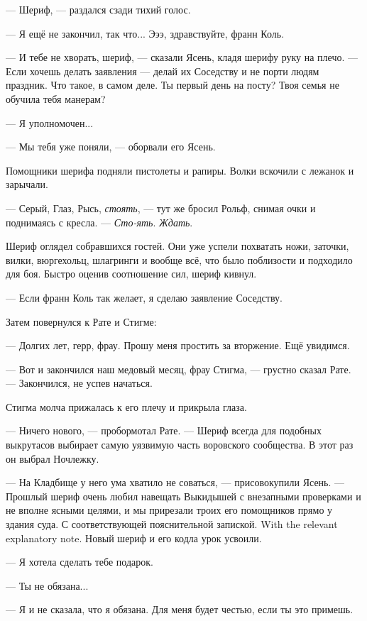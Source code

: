 --- Шериф, --- раздался сзади тихий голос.

--- Я ещё не закончил, так что...
Эээ, здравствуйте, франн Коль.

--- И тебе не хворать, шериф, --- сказали Ясень, кладя шерифу руку на плечо.
--- Если хочешь делать заявления --- делай их Соседству и не порти людям праздник.
Что такое, в самом деле.
Ты первый день на посту?
Твоя семья не обучила тебя манерам?

--- Я уполномочен...

--- Мы тебя уже поняли, --- оборвали его Ясень.

Помощники шерифа подняли пистолеты и рапиры.
Волки вскочили с лежанок и зарычали.

--- Серый, Глаз, Рысь, \textit{стоять}, --- тут же бросил Рольф, снимая очки и поднимаясь с кресла.
--- \textit{Сто-ять}.
\textit{Ждать}.

Шериф оглядел собравшихся гостей.
Они уже успели похватать ножи, заточки, вилки, вюргехольц, шлагринги и вообще всё, что было поблизости и подходило для боя.
Быстро оценив соотношение сил, шериф кивнул.

--- Если франн Коль так желает, я сделаю заявление Соседству.

Затем повернулся к Рате и Стигме:

--- Долгих лет, герр, фрау.
Прошу меня простить за вторжение.
Ещё увидимся.

--- Вот и закончился наш медовый месяц, фрау Стигма, --- грустно сказал Рате.
--- Закончился, не успев начаться.

Стигма молча прижалась к его плечу и прикрыла глаза.

\asterism

--- Ничего нового, --- пробормотал Рате.
--- Шериф всегда для подобных выкрутасов выбирает самую уязвимую часть воровского сообщества.
В этот раз он выбрал Ночлежку.

--- На Кладбище у него ума хватило не соваться, --- присовокупили Ясень.
--- Прошлый шериф очень любил навещать Выкидышей с внезапными проверками и не вполне ясными целями, и мы прирезали троих его помощников прямо у здания суда.
{С соответствующей пояснительной запиской.}
{With the relevant explanatory note.}
Новый шериф и его кодла урок усвоили.

\asterism

--- Я хотела сделать тебе подарок.

--- Ты не обязана...

--- Я и не сказала, что я обязана.
Для меня будет честью, если ты это примешь.

